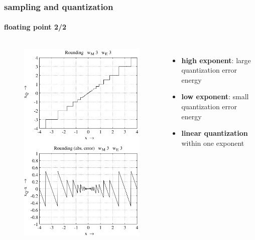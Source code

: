 	\begin{frame}\frametitle{sampling and quantization}\framesubtitle{floating point 2/2}
		\begin{columns}
			\column{5cm}
			\begin{figure}
				\centering
					\includegraphics[scale=0.35]{Graph/floatquanterror}
			\end{figure}
			
			\column{4cm}
			\pause
			\begin{itemize}
				\item	\textbf{high exponent}: large quantization error energy
				\item	\textbf{low exponent}: small quantization error energy
			    \pause
                \bigskip
                \item	\textbf{linear quantization} within one exponent
			\end{itemize}
		\end{columns}
	\end{frame}	
